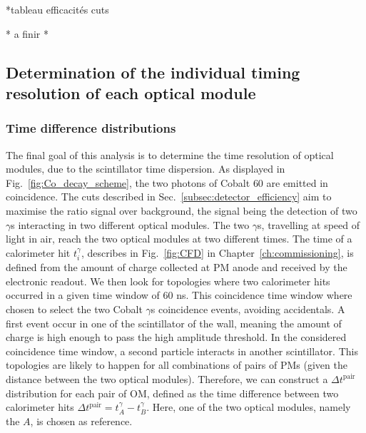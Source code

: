 *tableau efficacités cuts






* a finir *

\subsection{Determination of the individual timing resolution of each optical module}


\subsubsection*{Time difference distributions}

The final goal of this analysis is to determine the time resolution of optical modules, due to the scintillator time dispersion.
As displayed in Fig.~\ref{fig:Co_decay_scheme}, the two photons of Cobalt $60$ are emitted in coincidence.
The cuts described in Sec.~\ref{subsec:detector_efficiency} aim to maximise the ratio signal over background, the signal being the detection of two $\gamma$s interacting in two different optical modules.
The two $\gamma$s, travelling at speed of light in air, reach the two optical modules at two different times.
The time of a calorimeter hit $t^{\gamma}_{i}$, describes in Fig.~\ref{fig:CFD} in Chapter~\ref{ch:commissioning}, is defined from the amount of charge collected at PM anode and received by the electronic readout.
We then look for topologies where two calorimeter hits occurred in a given time window of $60$ ns.
This coincidence time window where chosen to select the two Cobalt $\gamma$s coincidence events, avoiding accidentals.
A first event occur in one of the scintillator of the wall, meaning the amount of charge is high enough to pass the high amplitude threshold.
In the considered coincidence time window, a second particle interacts in another scintillator.
This topologies are likely to happen for all combinations of pairs of PMs (given the distance between the two optical modules).
Therefore, we can construct a $\Delta t^{\text{pair}}$ distribution for each pair of OM, defined as the time difference between two calorimeter hits $\Delta t^{\text{pair}} = t^{\gamma}_{A} - t^{\gamma}_{B}$.
Here, one of the two optical modules, namely the $A$, is chosen as reference.

